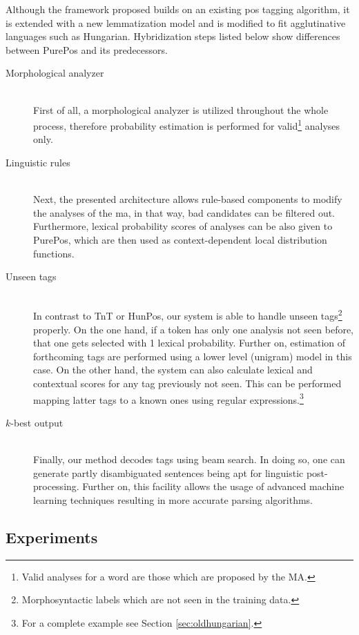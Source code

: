 Although the framework proposed builds on an existing \gls{pos} tagging algorithm, it is extended with a new lemmatization model and is modified to fit agglutinative languages such as Hungarian. 
Hybridization steps listed below show differences between PurePos and its predecessors.

\begin{description}
  \item[Morphological analyzer] \hfill \\
  First of all, a morphological analyzer is utilized throughout the whole process, therefore probability estimation is performed for valid\footnote{Valid analyses for a word are those which are proposed by the MA.} analyses only.
  \item[Linguistic rules] \hfill \\
  Next, the presented architecture allows rule-based components to modify the analyses of the \acrshort{ma}, in that way, bad candidates can be filtered out. Furthermore, lexical probability scores of analyses can be also given to PurePos, which are then used as context-dependent local distribution functions. 
  \item[Unseen tags] \hfill \\ 
  In contrast to TnT or HunPos, our system is able to handle unseen tags\footnote{Morphosyntactic labels which are not seen in the training data.} properly. On the one hand, if a token has only one analysis not seen before, that one gets selected with 1 lexical probability. Further on, estimation of forthcoming tags are performed using a lower level (unigram) model in this case. On the other hand, the system can also calculate lexical and contextual scores for any tag previously not seen. This can be performed mapping latter tags to a known ones using regular expressions.\footnote{For a complete example see Section \ref{sec:oldhungarian}.}
  \item[$k$-best output] \hfill \\
  Finally, our method decodes tags using beam search. In doing so, one can generate partly disambiguated sentences being apt for linguistic post-processing. Further on, this facility allows the usage of advanced machine learning techniques resulting in more accurate parsing algorithms.
\end{description}


\subsection{Experiments}

